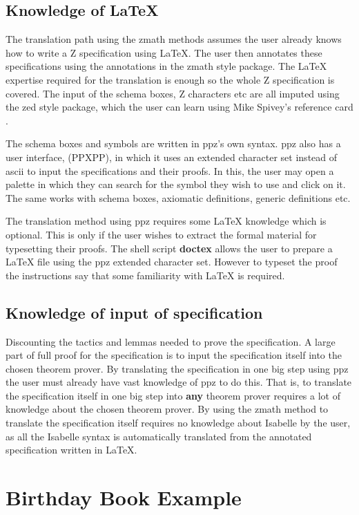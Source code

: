 \subsection{Knowledge of \LaTeX}
The translation path using the \gls{zmath} methods assumes the user already
knows how to write a Z specification using \LaTeX{}. The user then annotates
these specifications using the annotations in the \gls{zmath} style package. The
\LaTeX{} expertise required for the translation is enough so the whole Z
specification is covered. The input of the schema boxes, Z characters etc are
all imputed using the zed style package, which the user can learn using Mike
Spivey's reference card \cite{zrefcard}.

The schema boxes and symbols are written in \gls{ppz}'s own syntax. \gls{ppz}
also has a user interface, (PPXPP), in which it uses an extended character set
instead of ascii to input the specifications and their proofs. In this, the user
may open a palette in which they can search for the symbol they wish to use and
click on it. The same works with schema boxes, axiomatic definitions, generic
definitions etc. 

The translation method using \gls{ppz} requires some \LaTeX{} knowledge which is
optional. This is only if the user wishes to extract the formal material for
typesetting their proofs. The shell script \textbf{doctex} allows the user to
prepare a \LaTeX{} file using the \gls{ppz} extended character set. However to
typeset the proof the instructions say that some familiarity with \LaTeX{} is
required.

\subsection{Knowledge of input of specification}
Discounting the tactics and lemmas needed to prove the specification. A large
part of full proof for the specification is to input the specification itself
into the chosen theorem prover. By translating the specification in one big step
using \gls{ppz} the user must already have vast knowledge of \gls{ppz} to do
this. That is, to translate the specification itself in one big step into
\textbf{any} theorem prover requires a lot of knowledge about the chosen theorem
prover. By using the \gls{zmath} method to translate the specification itself
requires no knowledge about Isabelle by the user, as all the Isabelle syntax is
automatically translated from the annotated specification written in \LaTeX{}. 

\section{Birthday Book Example}

